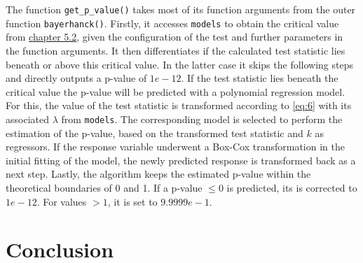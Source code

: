 \documentclass[12pt,a4paper]{article}
\begin{document}
The function \texttt{get\_p\_value()} takes most of its function
arguments from the outer function \texttt{bayerhanck()}. Firstly, it
accesses \texttt{models} to obtain the critical value from
\protect\hyperlink{correction-for-high-values-of-the-test-statistic}{chapter
5.2}, given the configuration of the test and further parameters in the
function arguments. It then differentiates if the calculated test
statistic lies beneath or above this critical value. In the latter case
it skips the following steps and directly outputs a p-value of
\(1e-12\). If the test statistic lies beneath the critical value the
p-value will be predicted with a polynomial regression model. For this,
the value of the test statistic is transformed according to \ref{eq:6}
with its associated \(\lambda\) from \texttt{models}. The corresponding
model is selected to perform the estimation of the p-value, based on the
transformed test statistic and \(k\) as regressors. If the response
variable underwent a Box-Cox transformation in the initial fitting of
the model, the newly predicted response is transformed back as a next
step. Lastly, the algorithm keeps the estimated p-value within the
theoretical boundaries of 0 and 1. If a p-value \(\leq 0\) is predicted,
its is corrected to \(1e-12\). For values \(> 1\), it is set to
\(9.9999e-1\).

\hypertarget{conclusion}{%
\section{Conclusion}\label{conclusion}}

\pagebreak

\setcounter{page}{3}
\printbibliography[title = References]
\cleardoublepage

\begin{refsection}
\nocite{R-base}
\nocite{R-stargazer}
\nocite{R-stringr}
\nocite{R-tidyr}
\nocite{R-dplyr}
\nocite{R-glmnet}
\nocite{R-class}
\nocite{R-MASS}
\nocite{R-plm}
\nocite{R-leaps}
\nocite{R-caret}
\nocite{R-tree}
\nocite{R-gbm}
\nocite{R-plotmo}
\nocite{R-pls}
\nocite{R-splines}
\nocite{R-tictoc}
\nocite{R-plotly}
\nocite{R-inspectdf}
\nocite{R-rpart}
\nocite{R-rpart.plot}
\nocite{R-stargazer}
\nocite{R-knitr}
\nocite{R-purrr}
\nocite{R-randomForest}
\nocite{R-rstudioapi}





\nocite{R-Studio}

\printbibliography[title = Software-References]
\end{refsection}
\end{document}
